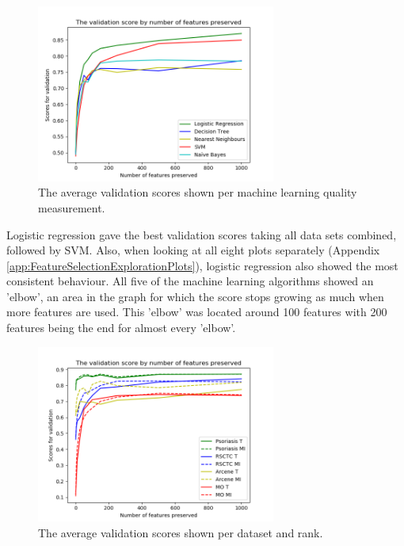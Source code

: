 	\begin{figure}[H]
		\includegraphics[width=0.7\textwidth]{Machine_Learning_Val_Scores.png}
		\caption{The average validation scores shown per machine learning quality measurement.}
		\label{fig:MachineLearningQualityScores}
	\end{figure}

	Logistic regression gave the best validation scores taking all data sets combined, followed by SVM. Also, when looking at all eight plots separately (Appendix \ref{app:FeatureSelectionExplorationPlots}), logistic regression also showed the most consistent behaviour. All five of the machine learning algorithms showed an 'elbow', an area in the graph for which the score stops growing as much when more features are used. This 'elbow' was located around 100 features with 200 features being the end for almost every 'elbow'.

	\begin{figure}[H]
		\includegraphics[width=0.7\textwidth]{Data_Rank_Val_Scores.png}
		\caption{The average validation scores shown per dataset and rank.}
		\label{fig:DatasetRankScores}
	\end{figure}
	
